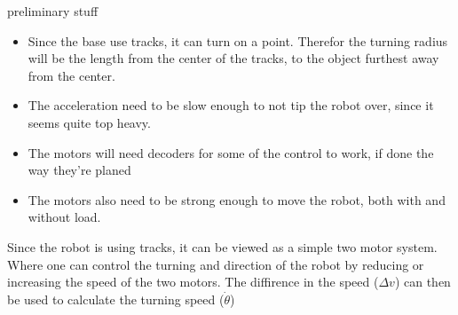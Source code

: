 preliminary stuff
\begin{itemize}
    \item Since the base use tracks, it can turn on a point. Therefor the turning radius will be the length from the center of the tracks, to the object furthest away from the center.
    \item The acceleration need to be slow enough to not tip the robot over, since it seems quite top heavy.
    \item The motors will need decoders for some of the control to work, if done the way they're planed
    \item The motors also need to be strong enough to move the robot, both with and without load.
\end{itemize}

Since the robot is using tracks, it can be viewed as a simple two motor system. Where one can control the turning
 and direction of the robot by reducing or increasing the speed of the two motors. The diffirence in the speed ($\Delta v$)
 can then be used to calculate the turning speed ($\dot{\theta}$)
